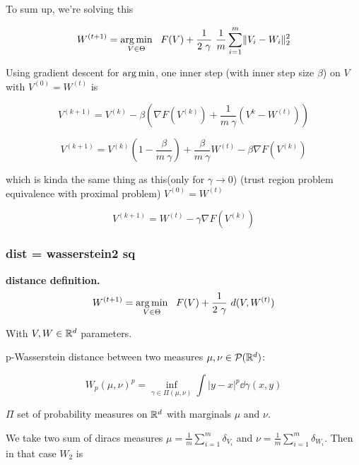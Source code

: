 To sum up, we're solving this 

\begin{equation}
	W^{(t+1)} = \argmin_{V \in \Theta} \ \  F(V) + \frac{1}{2 ~ \gamma} ~ \frac{1}{m} \sum_{i=1}^{m} \norm{V_i - W_i}^2_2
\end{equation}

Using gradient descent for $\operatorname*{arg\,min}$, one inner step (with inner step size $\beta$) on $V$ with $V^{(0)} = W^{(t)}$ is

\begin{equation}
	V^{(k+1)} = V^{(k)} - \beta \left(\nabla F(V^{(k)}) + \frac{1}{m ~ \gamma} (V^{k} - W^{(t)}) \right) 
\end{equation}

\begin{equation}
	V^{(k+1)} = V^{(k)}\left(1 - \frac{\beta}{m ~ \gamma}\right) + \frac{\beta}{m ~ \gamma} W^{(t)}   - \beta \nabla F(V^{(k)})
\end{equation}

which is kinda the same thing as this(only for $\gamma \rightarrow 0$) (trust region problem equivalence with proximal problem) $V^{(0)} = W^{(t)}$

\begin{equation}
	V^{(k+1)} = W^{(t)} - \gamma \nabla F(V^{(k)})
\end{equation}

\subsubsection{dist = wasserstein2 sq}

\textbf{distance definition.}
\begin{equation}
	W^{(t+1)} = \operatorname*{arg\,min}_{V \in \Theta} \ \  F(V) + \frac{1}{2 ~ \gamma} ~ d(V, W^{(t)})
\end{equation}


With $V, W \in \mathbb{R}^d$ parameters.

p-Wasserstein distance between two measures $\mu, \nu \in \mathcal{P}(\mathbb{R}^d)$: 

\begin{equation}
	W_p(\mu, \nu)^p = \inf_{\gamma \in \Pi(\mu, \nu)} \int |y - x|^p \dd \gamma(x, y)
\end{equation}

$\Pi$ set of probability measures on $\mathbb{R}^d$ with marginals $\mu$ and $\nu$.

We take two sum of diracs measures $\mu = \frac{1}{m} \sum_{i=1}^{m} \delta_{V_i}$ and $\nu = \frac{1}{m} \sum_{i=1}^{m} \delta_{W_i}$. Then in that case $W_2$ is


